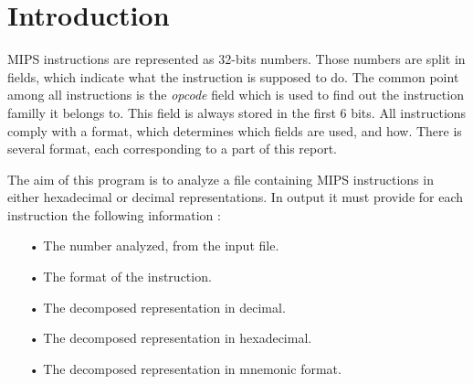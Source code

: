 \section{Introduction}

MIPS instructions are represented as 32-bits numbers. Those numbers are split in fields, which indicate what the instruction is supposed to do. The common point among all instructions is the \textit{opcode} field which is used to find out the instruction familly it belongs to. This field is always stored in the first 6 bits. All instructions comply with a format, which determines which fields are used, and how. There is several format, each corresponding to a part of this report.

The aim of this program is to analyze a file containing MIPS instructions in either hexadecimal or decimal representations. In output it must provide for each instruction the following information :
\begin{itemize}
\item[•] The number analyzed, from the input file.
\item[•] The format of the instruction.
\item[•] The decomposed representation in decimal.
\item[•] The decomposed representation in hexadecimal.
\item[•] The decomposed representation in mnemonic format.
\end{itemize}